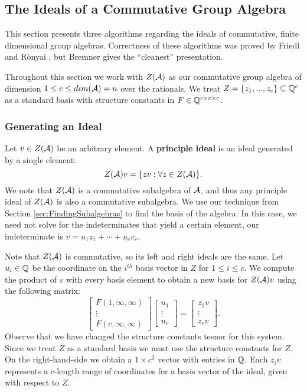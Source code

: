 \documentclass[../thesis.tex]{subfiles}
\begin{document}
 \subsection{The Ideals of a Commutative Group Algebra}\label{sec:idealsofalgebras}
This section presents three algorithms regarding the ideals of commutative, finite dimensional group algebras. Correctness of these algorithms was proved by Friedl and R\`onyai \cite{PolyTimeSolns}, but Bremner \cite{bremner} gives the \enquote{cleanest} presentation.

Throughout this section we work with $Z(\mathcal{A})$ as our commutative group algebra of dimension $1\leq c\leq dim(\mathcal{A}) = n$ over the rationals. We treat $Z = \{z_1,...,z_c\}\subseteq\mathbb{Q}^c$ as a standard basis with structure constants in $F\in\mathbb{Q}^{c\times c\times c}$. 

\subsubsection{Generating an Ideal}
Let $v\in Z(\mathcal{A})$ be an arbitrary element. A \textbf{principle ideal} is an ideal generated by a single element:
\begin{equation}\label{eq:principleidealgen}
    Z(\mathcal{A}) v = \{zv : \forall z\in Z(\mathcal{A})\}.
\end{equation}
We note that $Z(\mathcal{A})$ is a commutative subalgebra of $\mathcal{A}$, and thus any principle ideal of $Z(\mathcal{A})$ is also a commutative subalgebra. We use our technique from Section \ref{sec:FindingSubalgebras} to find the basis of the algebra. In this case, we need not solve for the indeterminates that yield a certain element, our indeterminate is $v = u_1z_1+\cdots+u_cv_c.$ 

Note that $Z(\mathcal{A})$ is commutative, so its left and right ideals are the same. Let $u_i\in\mathbb{Q}$ be the coordinate on the $i^{th}$ basis vector in $Z$ for $1\leq i\leq c.$ We compute the product of $v$ with every basis element to obtain a new basis for $Z(\mathcal{A})v$ using the following matrix:
\begin{equation*}
  \begin{bmatrix}
      F(1,\infty,\infty)\\\vdots\\ F(c,\infty,\infty)
  \end{bmatrix}
  \begin{bmatrix}
      u_1\\\vdots\\u_c
  \end{bmatrix}
  =
  \begin{bmatrix}
      z_1v\\
      \vdots\\
      z_cv
  \end{bmatrix}.
\end{equation*}
Observe that we have changed the structure constants tesnor for this system. Since we treat $Z$ as a standard basis we must use the structure constants for $Z.$ On the right-hand-side we obtain a $1\times c^2$ vector with entries in $\mathbb{Q}.$ Each $z_iv$ represents a $c$-length range of coordinates for a basis vector of the ideal, given with respect to $Z.$
\end{document}

